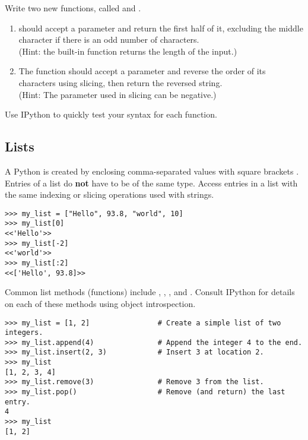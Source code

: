 \begin{problem} %
Write two new functions, called  and .
\begin{enumerate}
\item {} should accept a parameter and return the first half of it, excluding the middle character if there is an odd number of characters.
\\
(Hint: the built-in function  returns the length of the input.)
\item The  function should accept a parameter and reverse the order of its characters using slicing, then return the reversed string.
\\
(Hint: The  parameter used in slicing can be negative.)
\end{enumerate}
Use IPython to quickly test your syntax for each function.
\end{problem}

\subsection*{Lists} %

A Python  is created by enclosing comma-separated values with square brackets \li{[ ]}.
Entries of a list do \textbf{not} have to be of the same type.
Access entries in a list with the same indexing or slicing operations used with strings.

\begin{lstlisting}
>>> my_list = ["Hello", 93.8, "world", 10]
>>> my_list[0]
<<'Hello'>>
>>> my_list[-2]
<<'world'>>
>>> my_list[:2]
<<['Hello', 93.8]>>
\end{lstlisting}

Common list methods (functions) include , , , and .
Consult IPython for details on each of these methods using object introspection.
\begin{lstlisting}
>>> my_list = [1, 2]                # Create a simple list of two integers.
>>> my_list.append(4)               # Append the integer 4 to the end.
>>> my_list.insert(2, 3)            # Insert 3 at location 2.
>>> my_list
[1, 2, 3, 4]
>>> my_list.remove(3)               # Remove 3 from the list.
>>> my_list.pop()                   # Remove (and return) the last entry.
4
>>> my_list
[1, 2]
\end{lstlisting}

